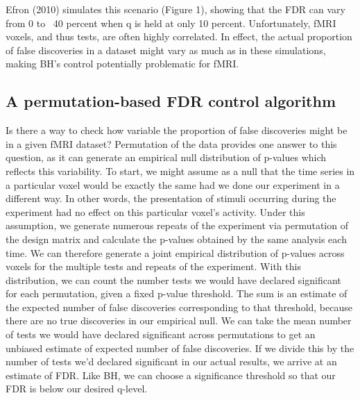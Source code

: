 \documentclass[11pt,notitlepage]{article}
\begin{document}
Efron (2010) simulates this scenario (Figure 1), showing that the FDR can vary from 0 to ~40 percent when q is held at only 10 percent. Unfortunately, fMRI voxels, and thus tests, are often highly correlated. In effect, the actual proportion of false discoveries in a dataset might vary as much as in these simulations, making BH's control potentially problematic for fMRI. 




\subsection*{A permutation-based FDR control algorithm}

Is there a way to check how variable the proportion of false discoveries might be in a given fMRI dataset? Permutation of the data provides one answer to this question, as it can generate an empirical null distribution of p-values which reflects this variability. To start, we might assume as a null that the time series in a particular voxel would be exactly the same had we done our experiment in a different way. In other words, the presentation of stimuli occurring during the experiment had no effect on this particular voxel's activity. Under this assumption, we generate numerous repeats of the experiment via permutation of the design matrix and calculate the p-values obtained by the same analysis each time. We can therefore generate a joint empirical distribution of p-values across voxels for the multiple tests and repeats of the experiment. With this distribution, we can count the number tests we would have declared significant for each permutation, given a fixed p-value threshold. The sum is an estimate of the expected number of false discoveries corresponding to that threshold, because there are no true discoveries in our empirical null. We can take the mean number of tests we would have declared significant across permutations to get an unbiased estimate of expected number of false discoveries. If we divide this by the number of tests we'd declared significant in our actual results, we arrive at an estimate of FDR. Like BH, we can choose a significance threshold so that our FDR is below our desired q-level. 
\end{document}
